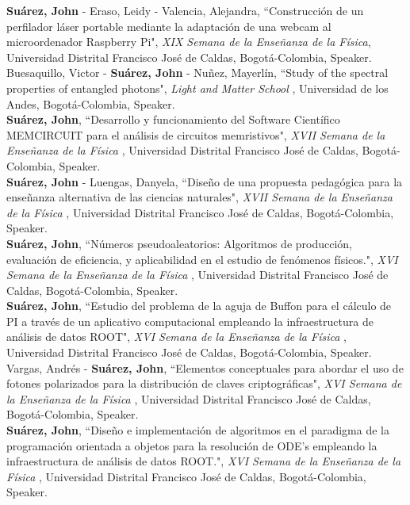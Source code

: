 \documentclass[10pt, a4paper]{article}
\newcommand{\years}[1]{\marginnote{\scriptsize #1}}
\begin{document}
\years{2016}\textbf{Suárez, John} - Eraso, Leidy - Valencia, Alejandra, “Construcción de un perfilador láser portable mediante la adaptación de una webcam al microordenador Raspberry Pi", \emph{XIX Semana de la Enseñanza de la Física}, Universidad Distrital Francisco José de Caldas, Bogotá-Colombia, Speaker.\\

\years{2016}Buesaquillo, Victor - \textbf{Suárez, John} - Nuñez, Mayerlín, “Study of the spectral properties of entangled photons", \emph{Light and Matter School }, Universidad de los Andes, Bogotá-Colombia, Speaker.\\

\years{2014}\textbf{Suárez, John}, “Desarrollo y funcionamiento del Software Científico MEMCIRCUIT para el análisis de circuitos memristivos", \emph{XVII Semana de la Enseñanza de la Física }, Universidad Distrital Francisco José de Caldas, Bogotá-Colombia, Speaker.\\

\years{2014}\textbf{Suárez, John} - Luengas, Danyela, “Diseño de una propuesta pedagógica para la enseñanza alternativa de las ciencias naturales", \emph{XVII Semana de la Enseñanza de la Física }, Universidad Distrital Francisco José de Caldas, Bogotá-Colombia, Speaker.\\

\years{2013}\textbf{Suárez, John}, “Números pseudoaleatorios: Algoritmos de producción, evaluación de eficiencia, y aplicabilidad en el estudio de fenómenos físicos.", \emph{XVI Semana de la Enseñanza de la Física }, Universidad Distrital Francisco José de Caldas, Bogotá-Colombia, Speaker.\\

\years{2013}\textbf{Suárez, John}, “Estudio del problema de la aguja de Buffon para el cálculo de PI a través de un aplicativo computacional empleando la infraestructura de análisis de datos ROOT", \emph{XVI Semana de la Enseñanza de la Física }, Universidad Distrital Francisco José de Caldas, Bogotá-Colombia, Speaker.\\

\newpage
\years{2013}Vargas, Andrés - \textbf{Suárez, John}, “Elementos conceptuales para abordar el uso de fotones polarizados para la distribución de claves criptográficas", \emph{XVI Semana de la Enseñanza de la Física }, Universidad Distrital Francisco José de Caldas, Bogotá-Colombia, Speaker.\\

\years{2013}\textbf{Suárez, John}, “Diseño e implementación de algoritmos en el paradigma de la programación orientada a objetos para la resolución de ODE's empleando la infraestructura de análisis de datos ROOT.", \emph{XVI Semana de la Enseñanza de la Física }, Universidad Distrital Francisco José de Caldas, Bogotá-Colombia, Speaker.\\
\end{document}
